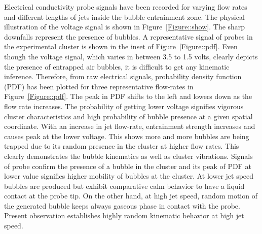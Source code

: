 Electrical conductivity probe signals have been recorded for varying flow rates and different lengths of jets inside the bubble entrainment zone. The physical illustration of the voltage signal is shown in Figure~\ref{Figure::show}. The sharp downfalls represent the presence of bubbles. A representative signal of probes in the experimental cluster is shown in the inset of Figure~\ref{Figure::pdf}. Even though the voltage signal, which varies in between 3.5 to 1.5 volts, clearly depicts the presence of entrapped air bubbles, it is difficult to get any kinematic inference. Therefore, from raw electrical signals, probability density function (PDF) has been plotted for three representative flow-rates in Figure~\ref{Figure::pdf}. The peak in PDF shifts to the left and lowers down as the flow rate increases. The probability of getting lower voltage signifies vigorous cluster characteristics and high probability of bubble presence at a given spatial coordinate. With an increase in jet flow-rate, entrainment strength increases and causes peak at the lower voltage. This shows more and more bubbles are being trapped due to its random presence in the cluster at higher flow rates. This clearly demonstrates the bubble kinematics as well as cluster vibrations. Signals of probe confirm the presence of a bubble in the cluster and its peak of PDF at lower value signifies higher mobility of bubbles at the cluster. At lower jet speed bubbles are produced but exhibit comparative calm behavior to have a liquid contact at the probe tip. On the other hand, at high jet speed, random motion of the generated bubble keeps always gaseous phase in contact with the probe. Present observation establishes highly random kinematic behavior at high jet speed.

